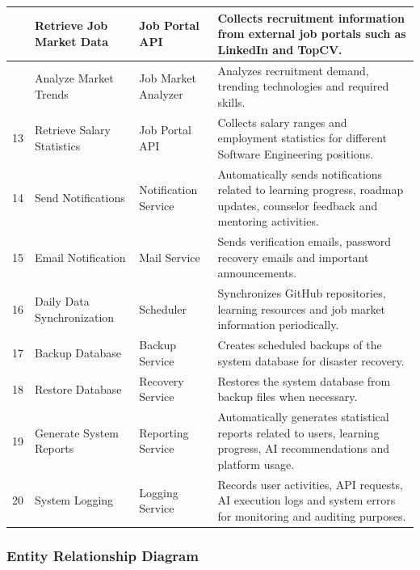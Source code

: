 \begin{longtable}{|>{\centering\arraybackslash}p{0.8cm}|p{3.8cm}|p{3.8cm}|p{7.8cm}|}
11 &
Retrieve Job Market Data &
Job Portal API &
Collects recruitment information from external job portals such as LinkedIn and TopCV.
\\
\hline

12 &
Analyze Market Trends &
Job Market Analyzer &
Analyzes recruitment demand, trending technologies and required skills.
\\
\hline

13 &
Retrieve Salary Statistics &
Job Portal API &
Collects salary ranges and employment statistics for different Software Engineering positions.
\\
\hline

14 &
Send Notifications &
Notification Service &
Automatically sends notifications related to learning progress, roadmap updates, counselor feedback and mentoring activities.
\\
\hline

15 &
Email Notification &
Mail Service &
Sends verification emails, password recovery emails and important announcements.
\\
\hline

16 &
Daily Data Synchronization &
Scheduler &
Synchronizes GitHub repositories, learning resources and job market information periodically.
\\
\hline

17 &
Backup Database &
Backup Service &
Creates scheduled backups of the system database for disaster recovery.
\\
\hline

18 &
Restore Database &
Recovery Service &
Restores the system database from backup files when necessary.
\\
\hline

19 &
Generate System Reports &
Reporting Service &
Automatically generates statistical reports related to users, learning progress, AI recommendations and platform usage.
\\
\hline

20 &
System Logging &
Logging Service &
Records user activities, API requests, AI execution logs and system errors for monitoring and auditing purposes.
\\
\hline

\end{longtable}

\subsubsection{Entity Relationship Diagram}

